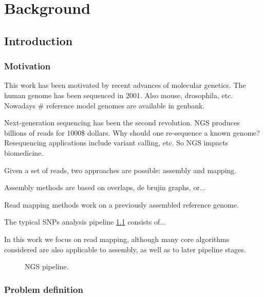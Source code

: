 \chapter{Background}


\section{Introduction}


\subsection{Motivation}

This work has been motivated by recent advances of molecular genetics.
The human genome has been sequenced in 2001. Also mouse, drosophila, etc.
Nowadays \# reference model genomes are available in genbank.

Next-generation sequencing has been the second revolution.
NGS produces billions of reads for 1000\$ dollars.
Why should one re-sequence a known genome?
Resequencing applications include variant calling, etc.
So NGS impacts biomedicine.

Given a set of reads, two approaches are possible: assembly and mapping.

Assembly methods are based on overlaps, de brujin graphs, or...

Read mapping methods work on a previously assembled reference genome.

The typical SNPs analysis pipeline \ref{fig:ngs-pipeline} consists of...

In this work we focus on read mapping, although many core algorithms considered are also applicable to assembly, as well as to later pipeline stages.

\begin{figure}[h]
\caption{NGS pipeline.}
\label{fig:ngs-pipeline}
\end{figure}


\subsection{Problem definition}

